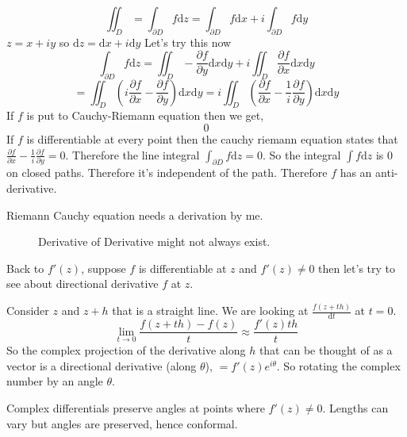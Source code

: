 \documentclass[letter]{article}
\begin{document}
\[
	\iint_D  = \int_{\partial D} f \mathrm{d} z = \int_{\partial D} f \mathrm{d} x + 
i \int_{\partial D} f \mathrm{d} y
\]
$z = x + iy$ so $\mathrm{d} z = \mathrm{d} x + i \mathrm{d} y$
Let's try this now
\[
	\int_{\partial D} f \mathrm{d} z =  \iint_D -\frac{\partial f}{\partial y} \mathrm{d} x \mathrm{d} y + 
	i \iint_D \frac{\partial f}{\partial x} \mathrm{d} x \mathrm{d} y
\]
\[
= \iint _D \left(i \frac{\partial f}{\partial x} - \frac{\partial f}{\partial y}\right) \mathrm{d} x \mathrm{d} y = i \iint_D \left(\frac{\partial f}{\partial x} - \frac{1}{i} \frac{\partial f}{\partial y}\right) \mathrm{d} x \mathrm{d} y
\]
If $f$ is put to Cauchy-Riemann equation then we get, 
\[
0
\]
If $f$ is differentiable at every point then the cauchy riemann equation states that $\frac{\partial f}{\partial x} - \frac{1}{i} \frac{\partial f}{\partial y} = 0$. Therefore the line integral 
$\int_{\partial D} f \mathrm{d} z = 0$. So the integral $\int f \mathrm{d} z$ is 0 on closed paths. Therefore it's independent of the path. Therefore $f$ has an anti-derivative.

Riemann Cauchy equation needs a derivation by me.

\begin{figure}[ht]
    \centering
    \caption{Derivative of Derivative might not always exist.}
    \label{fig:derivative-of-derivative-might-not-always-exist.}
\end{figure}
Back to $f'(z)$, suppose $f$ is differentiable at $z$ and $f'(z) \neq  0$ then let's try to see about directional derivative $f$ at $z$. 

Consider $z$ and $z+h$ that is a straight line. We are looking at 
$\frac{f(z+th)}{\mathrm{d} t}$ at $t = 0$. 
\[
\lim_{t \to 0} \frac{f(z+th)-f(z)}{t } \approx \frac{f'(z) th}{t}
\] So the complex projection of the derivative along $h$ that can be thought of as a vector is a directional derivative (along $\theta$), $= f'(z) e^{i \theta}$. So rotating the complex number by an angle $\theta$.

Complex differentials preserve angles at points where $f'(z) \neq  0$. Lengths can vary but angles are preserved, hence conformal.  
\end{document}
